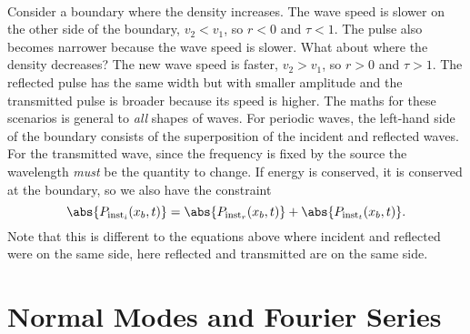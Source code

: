 \documentclass[../classical_mechanics.tex]{subfiles}
\begin{document}
        \paragraph{}
        Consider a boundary where the density increases.
        The wave speed is slower on the other side of the boundary, $v_2<v_1$, so $r<0$ and $\tau<1$.
        The pulse also becomes narrower because the wave speed is slower.
        What about where the density decreases?
        The new wave speed is faster, $v_2>v_1$, so $r>0$ and $\tau>1$.
        The reflected pulse has the same width but with smaller amplitude and the transmitted pulse is broader because its speed is higher.
        The maths for these scenarios is general to \textit{all} shapes of waves.
        For periodic waves, the left-hand side of the boundary consists of the superposition of the incident and reflected waves.
        For the transmitted wave, since the frequency is fixed by the source the wavelength \textit{must} be the quantity to change.
        If energy is conserved, it is conserved at the boundary, so we also have the constraint
        \begin{equation}
            \abs{P_{\text{inst}_i}(x_b,t)}=\abs{P_{\text{inst}_r}(x_b,t)}+\abs{P_{\text{inst}_t}(x_b,t)}.
        \end{equation}
        Note that this is different to the equations above where incident and reflected were on the same side, here reflected and transmitted are on the same side.

    \section{Normal Modes and Fourier Series}\label{sec:normal-modes-and-fourier-series}
\end{document}
